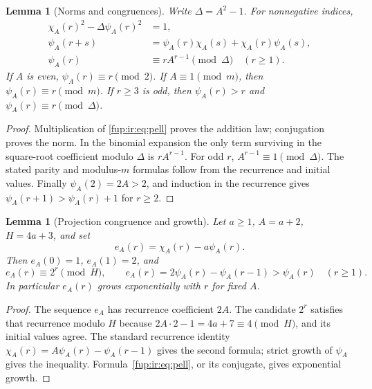 \documentclass[11pt,letterpaper]{article}
\newtheorem{lemma}[theorem]{Lemma}
\theoremstyle{definition}\newtheorem{definition}[theorem]{Definition}
\theoremstyle{remark}\newtheorem{remark}[theorem]{Remark}
\begin{document}
\begin{lemma}[Norms and congruences]\label{fup:ir:lem:pell}
Write $\Delta=A^2-1$. For nonnegative indices,
\begin{align}
 \chi_A(r)^2-\Delta\psi_A(r)^2&=1,\label{fup:ir:eq:pellnorm}\\
 \psi_A(r+s)&=\psi_A(r)\chi_A(s)+\chi_A(r)\psi_A(s),\label{fup:ir:eq:addition}\\
 \psi_A(r)&\equiv rA^{r-1}\pmod\Delta\quad(r\ge1).\label{fup:ir:eq:discrimcong}
\end{align}
If $A$ is even, $\psi_A(r)\equiv r\pmod2$. If $A\equiv1\pmod m$, then $\psi_A(r)\equiv r\pmod m$. If $r\ge3$ is odd, then $\psi_A(r)>r$ and $\psi_A(r)\equiv r\pmod\Delta$.
\end{lemma}
\begin{proof}
Multiplication of \eqref{fup:ir:eq:pell} proves the addition law; conjugation proves the norm. In the binomial expansion the only term surviving in the square-root coefficient modulo $\Delta$ is $rA^{r-1}$. For odd $r$, $A^{r-1}\equiv1\pmod\Delta$. The stated parity and modulus-$m$ formulas follow from the recurrence and initial values. Finally $\psi_A(2)=2A>2$, and induction in the recurrence gives $\psi_A(r+1)>\psi_A(r)+1$ for $r\ge2$.
\end{proof}

\begin{lemma}[Projection congruence and growth]\label{fup:ir:lem:projection}
Let $a\ge1$, $A=a+2$, $H=4a+3$, and set
\[
 e_A(r)=\chi_A(r)-a\psi_A(r).
\]
Then $e_A(0)=1$, $e_A(1)=2$, and
\begin{equation}\label{fup:ir:eq:projectionidentity}
 e_A(r)\equiv2^r\pmod H,\qquad
 e_A(r)=2\psi_A(r)-\psi_A(r-1)>\psi_A(r)\quad(r\ge1).
\end{equation}
In particular $e_A(r)$ grows exponentially with $r$ for fixed $A$.
\end{lemma}
\begin{proof}
The sequence $e_A$ has recurrence coefficient $2A$. The candidate $2^r$ satisfies that recurrence modulo $H$ because
$2A\cdot2-1=4a+7\equiv4\pmod H$, and its initial values agree. The standard recurrence identity $\chi_A(r)=A\psi_A(r)-\psi_A(r-1)$ gives the second formula; strict growth of $\psi_A$ gives the inequality. Formula~\eqref{fup:ir:eq:pell}, or its conjugate, gives exponential growth.
\end{proof}
\end{document}
